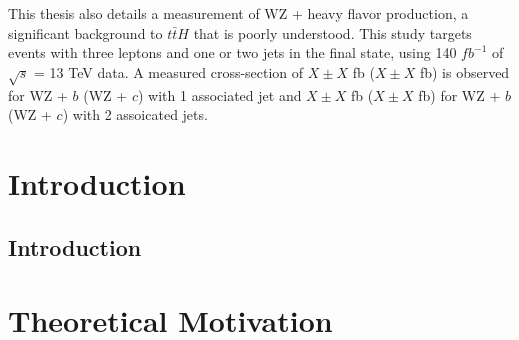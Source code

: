\documentclass[12pt]{report}	%
\theoremstyle{definition}
\theoremstyle{remark}
\begin{document}
\par This thesis also details a measurement of WZ + heavy flavor production, a significant background to $t\bar{t}H$ that is poorly understood. This study targets events with three leptons and one or two jets in the final state, using 140 $fb^{-1}$ of  $\sqrt{s}$ = 13 TeV data. A measured cross-section of $X\pm X$ fb ($X\pm X$ fb) is observed for WZ + $b$ (WZ + $c$) with 1 associated jet and $X\pm X$ fb ($X\pm X$ fb) for WZ + $b$ (WZ + $c$) with 2 assoicated jets.



\tableofcontents   %

\listoftables      %
\listoffigures     %


%
%
\chapter{Introduction}
\label{part:intro}
% 

\doublespacing
\section*{Introduction}
\label{sec:intro}


\chapter{Theoretical Motivation}
\label{part:theory}
% 
\end{document}
